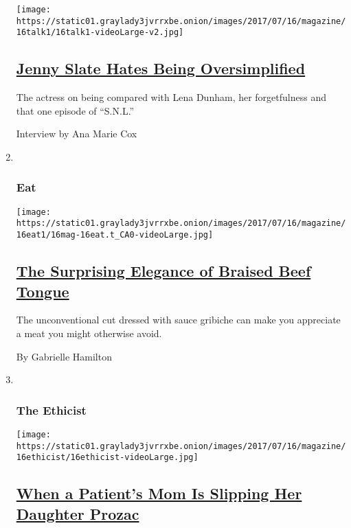 \begin{enumerate}
  \texttt{[image: https://static01.graylady3jvrrxbe.onion/images/2017/07/16/magazine/16talk1/16talk1-videoLarge-v2.jpg]}

  \hypertarget{jenny-slate-hates-being-oversimplified}{%
  \subsection{\texorpdfstring{\href{/2017/07/12/magazine/jenny-slate-hates-being-oversimplified.html}{Jenny
  Slate Hates Being
  Oversimplified}}{Jenny Slate Hates Being Oversimplified}}\label{jenny-slate-hates-being-oversimplified}}

  The actress on being compared with Lena Dunham, her forgetfulness and
  that one episode of ``S.N.L.''

  Interview by Ana Marie Cox
\item ~
  \hypertarget{eat}{%
  \subsubsection{Eat}\label{eat}}

  \texttt{[image: https://static01.graylady3jvrrxbe.onion/images/2017/07/16/magazine/16eat1/16mag-16eat.t\_CA0-videoLarge.jpg]}

  \hypertarget{the-surprising-elegance-of-braised-beef-tongue}{%
  \subsection{\texorpdfstring{\href{/2017/07/13/magazine/the-surprising-elegance-of-braised-beef-tongue.html}{The
  Surprising Elegance of Braised Beef
  Tongue}}{The Surprising Elegance of Braised Beef Tongue}}\label{the-surprising-elegance-of-braised-beef-tongue}}

  The unconventional cut dressed with sauce gribiche can make you
  appreciate a meat you might otherwise avoid.

  By Gabrielle Hamilton
\item ~
  \hypertarget{the-ethicist}{%
  \subsubsection{The Ethicist}\label{the-ethicist}}

  \texttt{[image: https://static01.graylady3jvrrxbe.onion/images/2017/07/16/magazine/16ethicist/16ethicist-videoLarge.jpg]}

  \hypertarget{when-a-patients-mom-is-slipping-her-daughter-prozac}{%
  \subsection{\texorpdfstring{\href{/2017/07/12/magazine/when-a-patients-mom-is-slipping-her-daughter-prozac.html}{When
  a Patient's Mom Is Slipping Her Daughter
  Prozac}}{When a Patient's Mom Is Slipping Her Daughter Prozac}}\label{when-a-patients-mom-is-slipping-her-daughter-prozac}}


\end{enumerate}
